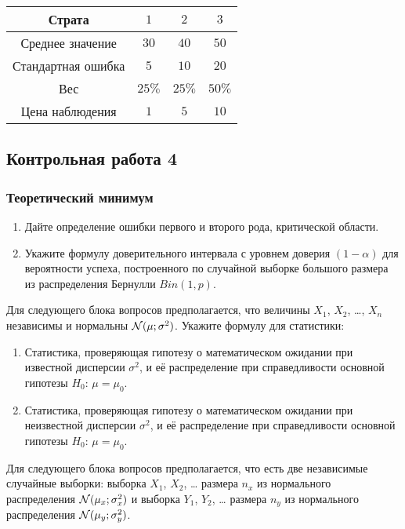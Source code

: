 \begin{enumerate}
\begin{center}
\begin{tabular}{cccc}
\toprule
 Страта & $1$ & $2$ & $3$  \\
 \midrule
 Среднее значение & $30$ & $40$ & $50$ \\
 Стандартная ошибка  & $5$ & $10$ & $20$ \\
 Вес & $25\%$ & $25\%$ & $50\%$ \\
 Цена наблюдения & $1$ & $5$ & $10$ \\
 \bottomrule
\end{tabular}
\end{center}
\end{enumerate}


\newpage
\subsection{Контрольная работа 4}

\subsubsection*{Теоретический минимум}

\begin{enumerate}
  \item Дайте определение ошибки первого и второго рода, критической области.
  \item Укажите формулу доверительного интервала с уровнем доверия $(1 - \alpha)$ для вероятности успеха,
	построенного по случайной выборке большого размера из распределения Бернулли $Bin(1, p)$.
\end{enumerate}

Для следующего блока вопросов предполагается, что величины $X_1$, $X_2$, \ldots, $X_n$ независимы и нормальны $\mathcal{N}(\mu;\sigma^2)$.
Укажите формулу для статистики:

\begin{enumerate}[resume]
  \item Статистика, проверяющая гипотезу о математическом ожидании при известной дисперсии $\sigma^2$,
    и её распределение при справедливости основной гипотезы  $H_0$: $\mu = \mu_0$.
  \item Статистика, проверяющая гипотезу о математическом ожидании при неизвестной дисперсии $\sigma^2$,
    и её распределение при справедливости основной гипотезы  $H_0$: $\mu = \mu_0$.
\end{enumerate}


Для следующего блока вопросов предполагается, что есть две независимые случайные выборки:
выборка $X_1$, $X_2$, \ldots{ }размера $n_x$ из нормального распределения $\mathcal{N}(\mu_x;\sigma^2_x)$
и выборка $Y_1$, $Y_2$, \ldots{ }размера $n_y$ из нормального распределения $\mathcal{N}(\mu_y;\sigma^2_y)$.

